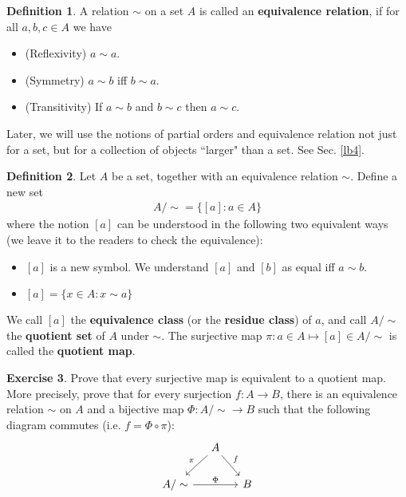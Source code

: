 \documentclass[12pt,b5paper,notitlepage]{article}
\theoremstyle{definition}
\newtheorem{df}{Definition}[section]
\newtheorem{exe}[df]{Exercise}
\theoremstyle{plain}
\numberwithin{equation}{section}
\begin{document}
\begin{df}
A relation $\sim$ on a set $A$ is called an \textbf{equivalence relation}, if for all $a,b,c\in A$ we have
\begin{itemize}
\item (Reflexivity) $a\sim a$.
\item (Symmetry) $a\sim b$ iff $b\sim a$.
\item (Transitivity) If $a\sim b$ and $b\sim c$ then $a\sim c$.
\end{itemize}
\end{df}

Later, we will use the notions of partial orders and equivalence relation not just for a set, but for a collection of objects ``larger" than a set. See Sec. \ref{lb4}.

\begin{df}
Let $A$ be a set, together with an equivalence relation $\sim$. Define a new set
\begin{align*}
{A/\sim}=\{[a]: a\in A\}
\end{align*}
where the notion $[a]$ can be understood in the following two equivalent ways (we leave it to the readers to check the equivalence):
\begin{itemize}
\item[(1)] $[a]$ is a new symbol. We understand $[a]$ and $[b]$ as equal iff $a\sim b$.
\item[(2)] $[a]=\{x\in A: x\sim a \}$
\end{itemize}
We call $[a]$ the \textbf{equivalence class} (or the \textbf{residue class}) of $a$, and call $A/\sim$ the \textbf{quotient set}  of $A$ under $\sim$. The surjective map $\pi:a\in A\mapsto [a]\in {A/\sim}$ is called the \textbf{quotient map}.
\end{df}


\begin{exe}
Prove that every surjective map  is equivalent to a quotient map. More precisely, prove that for every surjection $f:A\rightarrow B$, there is an equivalence relation $\sim$ on $A$ and a bijective map $\Phi:{A/\sim}\rightarrow B$ such that the following diagram commutes (i.e. $f=\Phi\circ\pi$):
\begin{equation}\label{eq7}
\begin{tikzcd}[column sep=small]
                          & A \arrow[rd, "f"] \arrow[ld, "\pi"'] &   \\
{A/\sim} \arrow[rr, "\Phi"] &                                      & B
\end{tikzcd}
\end{equation}
\end{exe}
\end{document}
